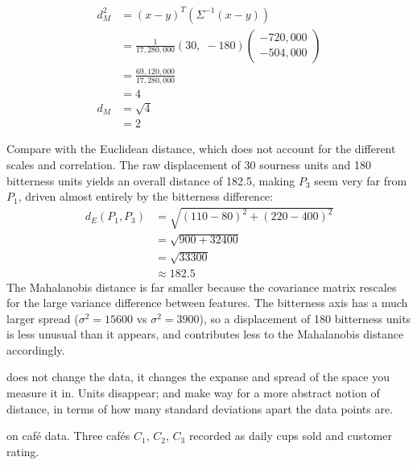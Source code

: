 \begin{align*}
    d_M^2 &= (x-y)^T (\Sigma^{-1} (x-y)) \\[4pt]
          &= \frac{1}{17{,}280{,}000}(30,\;{-}180)\begin{pmatrix}-720{,}000\\-504{,}000\end{pmatrix} \\[4pt]
          &= \frac{69{,}120{,}000}{17{,}280{,}000} \\[4pt]
          &= 4 \\[4pt]
    d_M   &= \sqrt{4} \\
          &= 2
\end{align*} 

Compare with the Euclidean distance, which does not account for the different scales and correlation. The raw displacement of 30 sourness units and 180 bitterness units yields an overall distance of 182.5, making $P_3$ seem very far from $P_1$, driven almost entirely by the bitterness difference:
\begin{align*}
    d_E(P_1, P_3) &= \sqrt{(110-80)^2 + (220-400)^2} \\
                  &= \sqrt{900 + 32400} \\
                  &= \sqrt{33300} \\
                  &\approx 182.5
\end{align*}
The Mahalanobis distance is far smaller because the covariance matrix rescales for the large variance difference between features.
The bitterness axis has a much larger spread ($\sigma^2{=}15600$ vs $\sigma^2{=}3900$), so a displacement of 180 bitterness units is less unusual than it appears, and contributes less to the Mahalanobis distance accordingly.

\vspace{2.5em}
 does not change the data, it changes the expanse and spread of the space you measure it in. Units disappear; and make way for a more abstract notion of distance, in terms of how many standard deviations apart the data points are.

 on café data.
Three cafés $C_1$, $C_2$, $C_3$ recorded as daily cups sold and customer rating.

